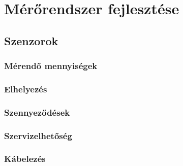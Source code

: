 \chapter{Mérőrendszer fejlesztése}
\label{sec:Fejleszt}


\section{Szenzorok}

\subsection{Mérendő mennyiségek}

\subsection{Elhelyezés}

\subsection{Szennyeződések}

\subsection{Szervizelhetőség}

\subsection{Kábelezés}


